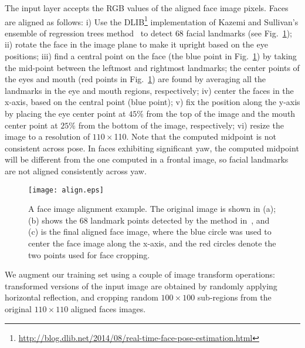 \documentclass[10pt,journal,compsoc]{IEEEtran}
\begin{document}
The input layer accepts the RGB values of the aligned face image pixels. Faces are aligned as follows:
i) Use the  DLIB\footnote{\url{http://blog.dlib.net/2014/08/real-time-face-pose-estimation.html}} implementation of Kazemi and Sullivan's ensemble of regression trees method~\cite{kazemi2014one} to detect $68$ facial landmarks (see Fig.~\ref{fig:alignment});
ii) rotate the face in the image plane to make it upright based on the eye positions;
iii) find a central point on the face (the blue point in Fig.~\ref{fig:alignment}) by taking the mid-point between the leftmost and rightmost landmarks; the center points of the eyes and mouth (red points in Fig.~\ref{fig:alignment}) are found by averaging all the landmarks in the eye and mouth regions, respectively;
iv) center the faces in the x-axis, based on the central point (blue point);
v) fix the position along the y-axis by placing the eye center point at $45\%$ from the top of the image and the mouth center point at $25\%$ from the bottom of the image, respectively;
vi) resize the image to a resolution of $110 \times $110. Note that the computed midpoint is not consistent across pose. In faces exhibiting significant yaw, the computed midpoint will be different from the one computed in a frontal image, so facial landmarks are not aligned consistently across yaw.

\begin{figure}[htbp]
  \centering
  \texttt{[image: align.eps]} \\
  \caption{A face image alignment example. The original image is shown in (a); (b) shows the 68 landmark points detected by the method in~\cite{kazemi2014one}, and (c) is the final aligned face image, where the blue circle was used to center the face image along the x-axis, and the red circles denote the two points used for face cropping.}\label{fig:alignment}
\end{figure}

We augment our training set using a couple of image transform operations: transformed versions of the input image are obtained by randomly applying horizontal reflection, and cropping random $100 \times 100$ sub-regions from the original $110 \times 110$ aligned faces images.
\end{document}
